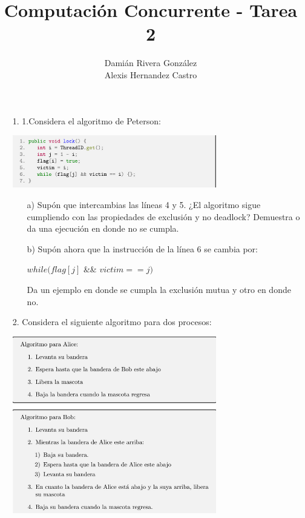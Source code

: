 \documentclass[12pt, letterpaper]{article}
\title{Computación Concurrente - Tarea 2}
\author{Damián Rivera González\\Alexis Hernandez Castro}
\begin{document}
\maketitle


\begin{itemize}
\item[1. ] 1.Considera el algoritmo de Peterson:\\

\begin{center}
\includegraphics[width=0.7\textwidth]{pettersonCode.png}\\
\end{center}
\begin{itemize}

\item[a) ] Sup\'on que intercambias las l\'ineas 4 y 5. ¿El algoritmo sigue cumpliendo
con las propiedades de exclusi\'on y no deadlock? Demuestra o da una
ejecuci\'on en donde no se cumpla.

\item[b) ]Sup\'on ahora que la instrucci\'on de la l\'inea 6 se cambia por:
\begin{center}
$while(flag[j]$ \&\& $victim == j)$
\end{center}
Da un ejemplo en donde se cumpla la exclusi\'on mutua y otro en donde no.

\end{itemize}


\item[2. ]Considera el siguiente algoritmo para dos procesos:

\begin{center}
\includegraphics[width=0.7\textwidth]{aliceCode.png}\\
\end{center}




\end{itemize}
\end{document}
